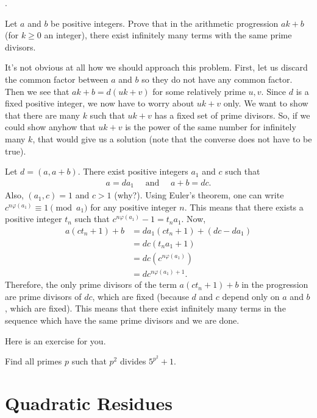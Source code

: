 \documentclass{subfile}
\begin{document}
	\textcite[Problem $68$]{WaclawSierpinski1964}.	
		\begin{problem}
			Let $a$ and $b$ be positive integers. Prove that in the arithmetic progression $ak+b$ (for $k \geq 0$ an integer), there exist infinitely many terms with the same prime divisors.
		\end{problem}
		
		\begin{solution}
			It's not obvious at all how we should approach this problem. First, let us discard the common factor between $a$ and $b$ so they do not have any common factor. Then we see that $ak+b=d(uk+v)$ for some relatively prime $u,v$. Since $d$ is a fixed positive integer, we now have to worry about $uk+v$ only. We want to show that there are many $k$ such that $uk+v$ has a fixed set of prime divisors. So, if we could show anyhow that $uk+v$ is the power of the same number for infinitely many $k$, that would give us a solution (note that the converse does not have to be true).
			
			Let $d=(a, a+b)$. There exist positive integers $a_1$ and $c$ such that
				\begin{align*}
					a=da_1 \quad \text{ and } \quad a+b=dc.
				\end{align*}
			Also, $(a_1,c)=1$ and $c >1$ (why?). Using Euler's theorem, one can write $c^{n\varphi(a_1)} \equiv 1 \pmod {a_1}$ for any positive integer $n$. This means that there exists a positive integer $t_n$ such that $c^{n\varphi(a_1)}-1 = t_na_1$. Now,
				\begin{align*}
					a(ct_n+1) + b &= da_1(ct_n+1) + (dc-da_1)\\
								  &= dc(t_na_1 + 1)\\
								  &= dc \left(c^{n\varphi(a_1)}\right)\\
								  &= dc^{n\varphi(a_1)+1}.
				\end{align*}
			Therefore, the only prime divisors of the term $a(ct_n+1) + b$ in the progression are prime divisors of $dc$, which are fixed (because $d$ and $c$ depend only on $a$ and $b$, which are fixed). This means that there exist infinitely many terms in the sequence which have the same prime divisors and we are done.
		\end{solution}
	Here is an exercise for you.
		\begin{problem}
			Find all primes $p$ such that $p^2$ divides $5^{p^2}+1$.
		\end{problem}
		
	
	\section{Quadratic Residues}\label{sec:qr}
		
\end{document}
